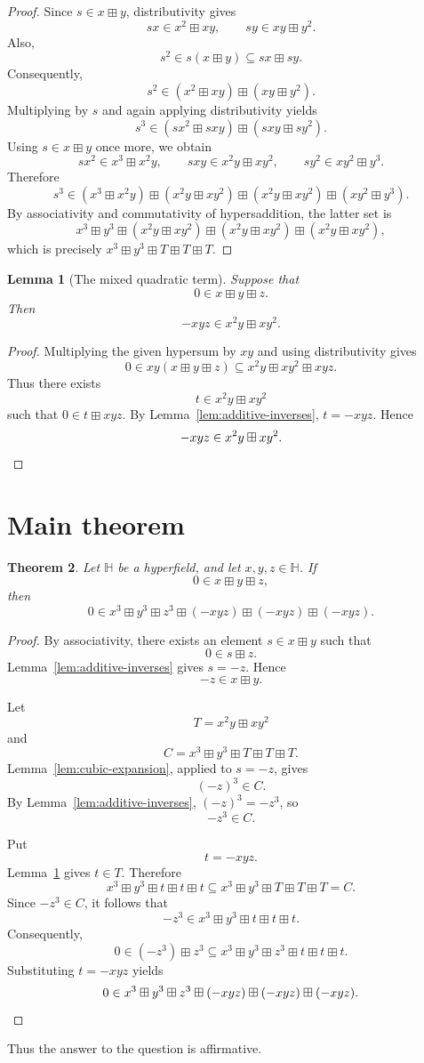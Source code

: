 \documentclass[11pt]{amsart}
\newtheorem{theorem}{Theorem}[section]
\newtheorem{lemma}[theorem]{Lemma}
\newcommand{\hs}{\boxplus}
\begin{document}
\begin{proof}
Since \(s\in x\hs y\), distributivity gives
\[
sx\in x^2\hs xy,
\qquad
sy\in xy\hs y^2.
\]
Also,
\[
s^2\in s(x\hs y)\subseteq sx\hs sy.
\]
Consequently,
\[
s^2\in (x^2\hs xy)\hs(xy\hs y^2).
\]
Multiplying by \(s\) and again applying distributivity yields
\[
s^3
\in
(sx^2\hs sxy)\hs(sxy\hs sy^2).
\]
Using \(s\in x\hs y\) once more, we obtain
\[
sx^2\in x^3\hs x^2y,\qquad
sxy\in x^2y\hs xy^2,\qquad
sy^2\in xy^2\hs y^3.
\]
Therefore
\[
s^3
\in
(x^3\hs x^2y)
\hs
(x^2y\hs xy^2)
\hs
(x^2y\hs xy^2)
\hs
(xy^2\hs y^3).
\]
By associativity and commutativity of hypersaddition, the latter set is
\[
x^3\hs y^3
\hs
(x^2y\hs xy^2)
\hs
(x^2y\hs xy^2)
\hs
(x^2y\hs xy^2),
\]
which is precisely \(x^3\hs y^3\hs T\hs T\hs T\).
\end{proof}

\begin{lemma}[The mixed quadratic term]
\label{lem:mixed-term}
Suppose that
\[
0\in x\hs y\hs z.
\]
Then
\[
-xyz\in x^2y\hs xy^2.
\]
\end{lemma}

\begin{proof}
Multiplying the given hypersum by \(xy\) and using distributivity gives
\[
0\in xy(x\hs y\hs z)
\subseteq x^2y\hs xy^2\hs xyz.
\]
Thus there exists
\[
t\in x^2y\hs xy^2
\]
such that \(0\in t\hs xyz\). By Lemma~\ref{lem:additive-inverses},
\(t=-xyz\). Hence
\[
-xyz\in x^2y\hs xy^2.
\qedhere
\]
\end{proof}

\section{Main theorem}

\begin{theorem}
\label{thm:main-cubic}
Let \(\mathbb H\) be a hyperfield, and let \(x,y,z\in\mathbb H\). If
\[
0\in x\hs y\hs z,
\]
then
\[
0\in
x^3\hs y^3\hs z^3
\hs(-xyz)\hs(-xyz)\hs(-xyz).
\]
\end{theorem}

\begin{proof}
By associativity, there exists an element \(s\in x\hs y\) such that
\[
0\in s\hs z.
\]
Lemma~\ref{lem:additive-inverses} gives \(s=-z\). Hence
\[
-z\in x\hs y.
\]

Let
\[
T=x^2y\hs xy^2
\]
and
\[
C=x^3\hs y^3\hs T\hs T\hs T.
\]
Lemma~\ref{lem:cubic-expansion}, applied to \(s=-z\), gives
\[
(-z)^3\in C.
\]
By Lemma~\ref{lem:additive-inverses}, \((-z)^3=-z^3\), so
\[
-z^3\in C.
\]

Put
\[
t=-xyz.
\]
Lemma~\ref{lem:mixed-term} gives \(t\in T\). Therefore
\[
x^3\hs y^3\hs t\hs t\hs t
\subseteq
x^3\hs y^3\hs T\hs T\hs T
=C.
\]
Since \(-z^3\in C\), it follows that
\[
-z^3\in x^3\hs y^3\hs t\hs t\hs t.
\]
Consequently,
\[
0\in(-z^3)\hs z^3
\subseteq
x^3\hs y^3\hs z^3\hs t\hs t\hs t.
\]
Substituting \(t=-xyz\) yields
\[
0\in
x^3\hs y^3\hs z^3
\hs(-xyz)\hs(-xyz)\hs(-xyz).
\qedhere
\]
\end{proof}

Thus the answer to the question is affirmative.
\end{document}
